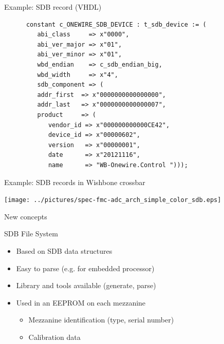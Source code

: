 \documentclass[compress,red]{beamer}
\begin{document}
\begin{frame}[fragile]{Example: SDB record (VHDL)} %

  \small
    \begin{verbatim}
      constant c_ONEWIRE_SDB_DEVICE : t_sdb_device := (
         abi_class     => x"0000",
         abi_ver_major => x"01",
         abi_ver_minor => x"01",
         wbd_endian    => c_sdb_endian_big,
         wbd_width     => x"4",
         sdb_component => (
         addr_first  => x"0000000000000000",
         addr_last   => x"0000000000000007",
         product     => (
            vendor_id => x"000000000000CE42",
            device_id => x"00000602",
            version   => x"00000001",
            date      => x"20121116",
            name      => "WB-Onewire.Control ")));
    \end{verbatim}
    \normalsize

    \note[item]{}

\end{frame}

\begin{frame}{Example: SDB records in Wishbone crossbar}

  \begin{center}
    \texttt{[image: ../pictures/spec-fmc-adc\_arch\_simple\_color\_sdb.eps]}
  \end{center}

  \note[item]{}

\end{frame}

\begin{frame}{New concepts}

  \begin{block}{SDB File System}
    \begin{itemize}
    \item Based on SDB data structures
    \item Easy to parse (e.g. for embedded processor)
    \item Library and tools available (generate, parse)
    \item Used in an EEPROM on each mezzanine
      \begin{itemize}
      \item Mezzanine identification (type, serial number)
      \item Calibration data
      \end{itemize}
    \end{itemize}
  \end{block}

  \note[item]{}

\end{frame}
\end{document}
